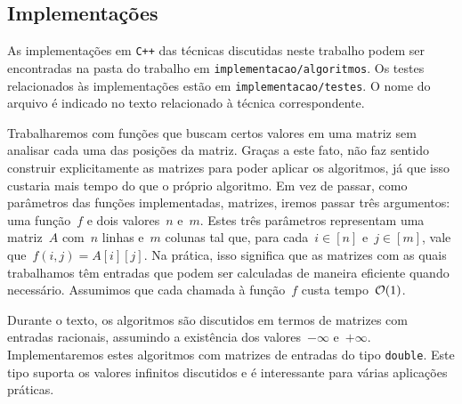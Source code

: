 \subsection{Implementações} \label{Intro:impl}
As implementações em \texttt{C++} das técnicas discutidas neste trabalho podem ser encontradas na pasta do trabalho em \texttt{implementacao/algoritmos}. Os testes relacionados às implementações estão em \texttt{implementacao/testes}. O nome do arquivo é indicado no texto relacionado à técnica correspondente.

Trabalharemos com funções que buscam certos valores em uma matriz sem analisar cada uma das posições da matriz. Graças a este fato, não faz sentido construir explicitamente as matrizes para poder aplicar os algoritmos, já que isso custaria mais tempo do que o próprio algoritmo. Em vez de passar, como parâmetros das funções implementadas, matrizes, iremos passar três argumentos: uma função~$f$ e dois valores~$n$ e~$m$. Estes três parâmetros representam uma matriz~$A$ com~$n$ linhas e~$m$ colunas tal que, para cada~${ i \in [n] }$ e~${ j \in [m] }$, vale que~${ f(i,j) = A[i][j] }$. Na prática, isso significa que as matrizes com as quais trabalhamos têm entradas que podem ser calculadas de maneira eficiente quando necessário. Assumimos que cada chamada à função~$f$ custa tempo~$\mathcal{O}(1)$.

Durante o texto, os algoritmos são discutidos em termos de matrizes com entradas racionais, assumindo a existência dos valores~$-\infty$ e~$+\infty$. Implementaremos estes algoritmos com matrizes de entradas do tipo \texttt{double}. Este tipo suporta os valores infinitos discutidos e é interessante para várias aplicações práticas.
